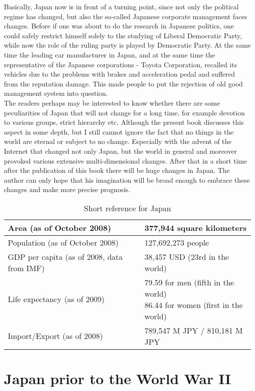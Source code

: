 \documentclass[11pt]{book}
\begin{document}
Basically, Japan now is in front of a turning point, since not only the political regime has changed, but also the so-called Japanese corporate management faces changes.
Before if one was about to do the research in Japanese politics, one could safely restrict himself solely to the studying of Liberal Democratic Party,
while now the role of the ruling party is played by Democratic Party. At the same time the leading car manufacturer in Japan, and at the same time the representative
of the Japanese corporations - Toyota Corporation, recalled its vehicles due to the problems with brakes and acceleration pedal and suffered from the reputation damage. This made
people to put the rejection of old good management system into question.\\
The readers perhaps may be interested to know whether there are some peculiarities of Japan that will not change for a long time,
for example devotion to various groups, strict hierarchy etc. Although the present book discusses this aspect in some depth, but I still cannot
ignore the fact that no things in the world are eternal or subject to no change. Especially with the advent of the Internet that changed not
only Japan, but the world in general and moreover provoked various extensive multi-dimensional changes. After that in a short time after the
publication of this book there will be huge changes in Japan. The author can only hope that his imagination will be broad enough to embrace
these changes and make more precise prognosis.
\begin{table}[H]
\caption{Short reference for Japan}
\centering
\begin{tabular}{|l|l|}
	\hline
	Area (as of October 2008) & 377,944 square kilometers\\
	\hline
	Population (as of October 2008) & 127,692,273 people\\
	\hline
	GDP per capita (as of 2008, data from IMF) & 38,457 USD (23rd in the world)\\
	\hline
	Life expectancy (as of 2009) & \parbox{6cm}{79.59 for men (fifth in the world)\\86.44 for women (first in the world)}\\
	\hline
	Import/Export (as of 2008) & 789,547 M JPY / 810,181 M JPY\\
	\hline
\end{tabular}
\end{table}
\part{Japan prior to the World War II}
\end{document}

